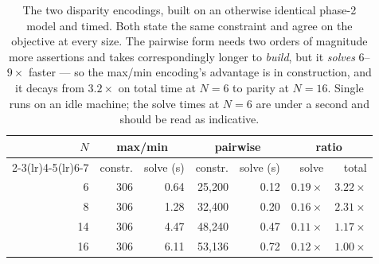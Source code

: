 \begin{table}[t]
\centering
\caption{The two disparity encodings, built on an otherwise identical phase-2 model and timed. Both state the same constraint and agree on the objective at every size. The pairwise form needs two orders of magnitude more assertions and takes correspondingly longer to \emph{build}, but it \emph{solves} $6$--$9\times$ faster --- so the max/min encoding's advantage is in construction, and it decays from $3.2\times$ on total time at $N{=}6$ to parity at $N{=}16$. Single runs on an idle machine; the solve times at $N{=}6$ are under a second and should be read as indicative.}
\label{tab:pairwise}
\begin{tabular}{r rr rr rr}
\toprule
\multirow{2}{*}{$N$} & \multicolumn{2}{c}{max/min} & \multicolumn{2}{c}{pairwise} & \multicolumn{2}{c}{ratio} \\
\cmidrule(lr){2-3}\cmidrule(lr){4-5}\cmidrule(lr){6-7}
 & constr. & solve (s) & constr. & solve (s) & solve & total \\
\midrule
6 & 306 & 0.64 & 25,200 & 0.12 & $0.19\times$ & $3.22\times$ \\
8 & 306 & 1.28 & 32,400 & 0.20 & $0.16\times$ & $2.31\times$ \\
14 & 306 & 4.47 & 48,240 & 0.47 & $0.11\times$ & $1.17\times$ \\
16 & 306 & 6.11 & 53,136 & 0.72 & $0.12\times$ & $1.00\times$ \\
\bottomrule
\end{tabular}
\end{table}

